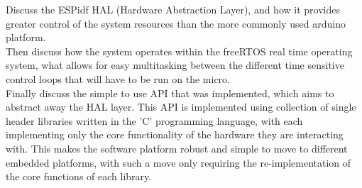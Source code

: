 Discuss the ESPidf HAL (Hardware Abstraction Layer), and how it provides greater control of the system resources than the more commonly used arduino platform. 
\\
Then discuss how the system operates within the freeRTOS real time operating system, what allows for easy multitasking between the different time sensitive control loops that will have to be run on the micro.  
\\
Finally discuss the simple to use API that was implemented, which aims to abstract away the HAL layer. This API is implemented using collection of single header libraries written in the 'C' programming language, with each implementing only the core functionality of the hardware they are interacting with. This makes the software platform robust and simple to move to different embedded platforms, with such a move only requiring the re-implementation of the core functions of each library. 
